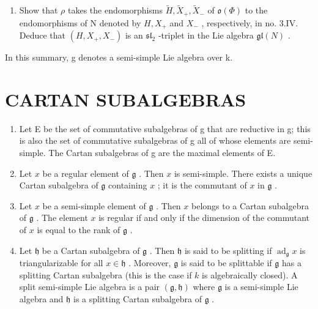 \begin{enumerate}
\def\labelenumi{\alph{enumi})}
\setcounter{enumi}{2}
\tightlist
\item
  Show that \(\rho\) takes the endomorphisms \(\tilde{H}, \tilde{X}_{+}, \tilde{X}_{-}\) of \(\mathfrak{o}(\Phi)\) to the endomorphisms of N denoted by \(H, X_{+}\) and \(X_{-}\) , respectively, in no. 3.IV. Deduce that \((H, X_{+}, X_{-})\) is an \(\mathfrak{sl}_{2}\) -triplet in the Lie algebra \(\mathfrak{gl}(N)\) .
\end{enumerate}


In this summary, g denotes a semi-simple Lie algebra over k.

\section*{CARTAN SUBALGEBRAS}

\begin{enumerate}
\def\labelenumi{\arabic{enumi})}
\item
  Let E be the set of commutative subalgebras of g that are reductive in g; this is also the set of commutative subalgebras of g all of whose elements are semi-simple. The Cartan subalgebras of g are the maximal elements of E.
\item
  Let \(x\) be a regular element of \(\mathfrak{g}\) . Then \(x\) is semi-simple. There exists a unique Cartan subalgebra of \(\mathfrak{g}\) containing \(x\) ; it is the commutant of \(x\) in \(\mathfrak{g}\) .
\item
  Let \(x\) be a semi-simple element of \(\mathfrak{g}\) . Then \(x\) belongs to a Cartan subalgebra of \(\mathfrak{g}\) . The element \(x\) is regular if and only if the dimension of the commutant of \(x\) is equal to the rank of \(\mathfrak{g}\) .
\item
  Let \(\mathfrak{h}\) be a Cartan subalgebra of \(\mathfrak{g}\) . Then \(\mathfrak{h}\) is said to be splitting if \(\operatorname{ad}_{\mathfrak{g}}x\) is triangularizable for all \(x \in \mathfrak{h}\) . Moreover, \(\mathfrak{g}\) is said to be splittable if \(\mathfrak{g}\) has a splitting Cartan subalgebra (this is the case if \(k\) is algebraically closed). A split semi-simple Lie algebra is a pair \((\mathfrak{g}, \mathfrak{h})\) where \(\mathfrak{g}\) is a semi-simple Lie algebra and \(\mathfrak{h}\) is a splitting Cartan subalgebra of \(\mathfrak{g}\) .
\end{enumerate}

